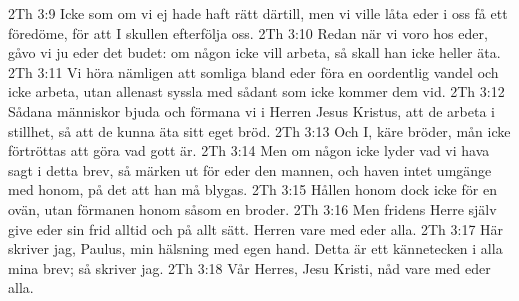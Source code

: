 2Th 3:9  Icke som om vi ej hade haft rätt därtill, men vi ville låta eder i oss få ett föredöme, för att I skullen efterfölja oss.
2Th 3:10  Redan när vi voro hos eder, gåvo vi ju eder det budet: om någon icke vill arbeta, så skall han icke heller äta.
2Th 3:11  Vi höra nämligen att somliga bland eder föra en oordentlig vandel och icke arbeta, utan allenast syssla med sådant som icke kommer dem vid.
2Th 3:12  Sådana människor bjuda och förmana vi i Herren Jesus Kristus, att de arbeta i stillhet, så att de kunna äta sitt eget bröd.
2Th 3:13  Och I, käre bröder, mån icke förtröttas att göra vad gott är.
2Th 3:14  Men om någon icke lyder vad vi hava sagt i detta brev, så märken ut för eder den mannen, och haven intet umgänge med honom, på det att han må blygas.
2Th 3:15  Hållen honom dock icke för en ovän, utan förmanen honom såsom en broder.
2Th 3:16  Men fridens Herre själv give eder sin frid alltid och på allt sätt. Herren vare med eder alla.
2Th 3:17  Här skriver jag, Paulus, min hälsning med egen hand. Detta är ett kännetecken i alla mina brev; så skriver jag.
2Th 3:18  Vår Herres, Jesu Kristi, nåd vare med eder alla.


